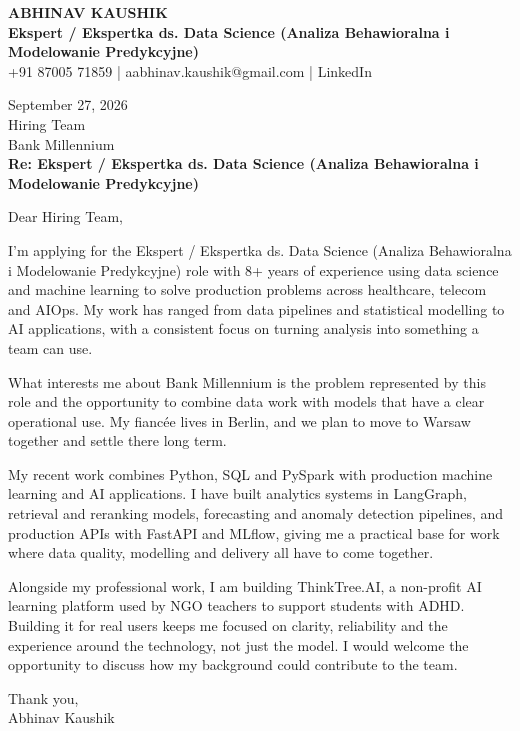 \documentclass[10pt,a4paper]{article}
\begin{document}
\begin{center}
{\Large\bfseries ABHINAV KAUSHIK}\\[2pt]
{\bfseries Ekspert / Ekspertka ds. Data Science (Analiza Behawioralna i Modelowanie Predykcyjne)}\\[2pt]
+91 87005 71859 \quad | \quad aabhinav.kaushik@gmail.com \quad | \quad LinkedIn
\end{center}
\vspace{8pt}
September 27, 2026\\[6pt]
Hiring Team\\
Bank Millennium\\[4pt]
\textbf{Re: Ekspert / Ekspertka ds. Data Science (Analiza Behawioralna i Modelowanie Predykcyjne)}

Dear Hiring Team,

I’m applying for the Ekspert / Ekspertka ds. Data Science (Analiza Behawioralna i Modelowanie Predykcyjne) role with 8+ years of experience using data science and machine learning to solve production problems across healthcare, telecom and AIOps. My work has ranged from data pipelines and statistical modelling to AI applications, with a consistent focus on turning analysis into something a team can use.

What interests me about Bank Millennium is the problem represented by this role and the opportunity to combine data work with models that have a clear operational use. My fiancée lives in Berlin, and we plan to move to Warsaw together and settle there long term.

My recent work combines Python, SQL and PySpark with production machine learning and AI applications. I have built analytics systems in LangGraph, retrieval and reranking models, forecasting and anomaly detection pipelines, and production APIs with FastAPI and MLflow, giving me a practical base for work where data quality, modelling and delivery all have to come together.

Alongside my professional work, I am building ThinkTree.AI, a non-profit AI learning platform used by NGO teachers to support students with ADHD. Building it for real users keeps me focused on clarity, reliability and the experience around the technology, not just the model. I would welcome the opportunity to discuss how my background could contribute to the team.

Thank you,\\
Abhinav Kaushik
\end{document}
